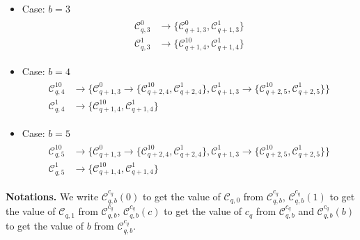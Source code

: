 \documentclass{article}
\newtheorem*{theorem A}{Theorem A}
\newtheorem*{theorem B}{N\"olker's Theorem}
\theoremstyle{remark}
\theoremstyle{remark}
\begin{document}
\begin{itemize}
    \item Case: $b = 3$
        \begin{align}
            \begin{split}
                \mathcal{C}^{0}_{q,3} &\rightarrow \{\mathcal{C}^{0}_{q+1,3}, \mathcal{C}^{1}_{q+1,3}\}\\
                \mathcal{C}^{1}_{q,3} &\rightarrow \{\mathcal{C}^{10}_{q+1,4}, \mathcal{C}^{1}_{q+1,4}\}
            \end{split}
        \label{eq:b3}
        \end{align}
    \item Case: $b = 4$
        \begin{align}
            \begin{split}
                \mathcal{C}^{10}_{q,4} &\rightarrow \{\mathcal{C}^{0}_{q+1,3} \rightarrow \{\mathcal{C}^{10}_{q+2,4}, \mathcal{C}^{1}_{q+2,4}\}, \mathcal{C}^{1}_{q+1,3} \rightarrow \{\mathcal{C}^{10}_{q+2,5}, \mathcal{C}^{1}_{q+2,5}\}\}\\
                \mathcal{C}^{1}_{q,4} &\rightarrow \{\mathcal{C}^{10}_{q+1,4}, \mathcal{C}^{1}_{q+1,4}\}
            \end{split}
        \label{eq:b4}
        \end{align}
    \item Case: $b = 5$
        \begin{align}
             \begin{split}
                \mathcal{C}^{10}_{q,5} &\rightarrow \{\mathcal{C}^{0}_{q+1,3} \rightarrow \{\mathcal{C}^{10}_{q+2,4}, \mathcal{C}^{1}_{q+2,4}\}, \mathcal{C}^{1}_{q+1,3} \rightarrow \{\mathcal{C}^{10}_{q+2,5}, \mathcal{C}^{1}_{q+2,5}\}\}\\
                \mathcal{C}^{1}_{q,5} &\rightarrow \{\mathcal{C}^{10}_{q+1,4}, \mathcal{C}^{1}_{q+1,4}\}
            \end{split}
        \label{eq:b5}
        \end{align}
\label{it:casesrules}
\end{itemize}

\textbf{Notations.} We write $\mathcal{C}^{c_{q}}_{q,b}\left(0\right)$ to get the value of $\mathcal{C}_{q,0}$ from $\mathcal{C}^{c_{q}}_{q,b}$, $\mathcal{C}^{c_{q}}_{q,b}\left(1\right)$ to get the value of $\mathcal{C}_{q,1}$ from $\mathcal{C}^{c_{q}}_{q,b}$, $\mathcal{C}^{c_{q}}_{q,b}\left(c\right)$ to get the value of $c_{q}$ from $\mathcal{C}^{c_{q}}_{q,b}$ and $\mathcal{C}^{c_{q}}_{q,b}\left(b\right)$ to get the value of $b$ from $\mathcal{C}^{c_{q}}_{q,b}$.
\end{document}
